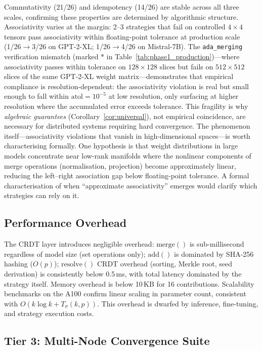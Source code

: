 \documentclass[10pt,letterpaper]{article}
\begin{document}
Commutativity (21/26) and idempotency (14/26) are stable across all three scales, confirming these properties are determined by algorithmic structure.
Associativity varies at the margin: 2--3 strategies that fail on controlled $4{\times}4$ tensors pass associativity within floating-point tolerance at production scale (1/26$\to$3/26 on GPT-2-XL; 1/26$\to$4/26 on Mistral-7B).
The \texttt{ada\_merging} verification mismatch (marked $\ast$ in Table~\ref{tab:phase1_production})---where associativity passes within tolerance on $128\times 128$ slices but fails on $512\times 512$ slices of the same GPT-2-XL weight matrix---demonstrates that empirical compliance is resolution-dependent: the associativity violation is real but small enough to fall within $\mathrm{atol}=10^{-5}$ at low resolution, only surfacing at higher resolution where the accumulated error exceeds tolerance.
This fragility is why \emph{algebraic guarantees} (Corollary~\ref{cor:universal}), not empirical coincidence, are necessary for distributed systems requiring hard convergence.
The phenomenon itself---associativity violations that vanish in high-dimensional spaces---is worth characterising formally.
One hypothesis is that weight distributions in large models concentrate near low-rank manifolds where the nonlinear components of merge operations (normalisation, projection) become approximately linear, reducing the left--right association gap below floating-point tolerance.
A formal characterisation of when ``approximate associativity'' emerges would clarify which strategies can rely on it.

\subsection{Performance Overhead}\label{sec:performance}

The CRDT layer introduces negligible overhead: $\mathrm{merge}()$ is sub-millisecond regardless of model size (set operations only); $\mathrm{add}()$ is dominated by SHA-256 hashing ($O(p)$); $\mathrm{resolve}()$ CRDT overhead (sorting, Merkle root, seed derivation) is consistently below 0.5\,ms, with total latency dominated by the strategy itself.
Memory overhead is below 10\,KB for 16 contributions.
Scalability benchmarks on the A100 confirm linear scaling in parameter count, consistent with $O(k\log k + T_\sigma(k,p))$.
This overhead is dwarfed by inference, fine-tuning, and strategy execution costs.


\subsection{Tier 3: Multi-Node Convergence Suite}\label{sec:convergence_suite}
\end{document}
